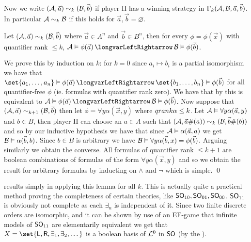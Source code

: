 \edefn

Now we write $({\cal A},\vec a)\sim_k({\cal B},\vec b)$ if player II has a winning strategy in $\Gamma_k({\cal A},{\cal B},\vec a,\vec b)$.
In particular ${\cal A}\sim_k{\cal B}$ if this holds for $\vec a,\vec b=\varnothing$.

\blemm

    Let $({\cal A},\vec a)\sim_k({\cal B},\vec b)$ where $\vec a\in A^n$ and $\vec b\in B^n$, then for every $\phi=\phi(\vec x)$ with quantifier rank $\leq k$,
    ${\cal A}\vDash\phi(\vec a)\iff{\cal B}\vDash\phi(\vec b)$.

\elemm

We prove this by induction on $k$: for $k=0$ since $a_i\mapsto b_i$ is a partial isomorphism we have that $\set{a_1,\dots,a_n}\vDash\phi(\vec a)\iff\set{b_1,\dots,b_n}\vDash\phi(\vec b)$ for all
quantifier-free $\phi$ (ie. formulas with quantifier rank zero).
We have that by  this is equivalent to ${\cal A}\vDash\phi(\vec a)\iff{\cal B}\vDash\phi(\vec b)$.
Now suppose that $({\cal A},\vec a)\sim_{k+1}({\cal B},\vec b)$ then let $\phi=\forall y\alpha(\vec x,y)$ where ${\sl qrank}\alpha\leq k$.
Let ${\cal A}\vDash\forall y\alpha(\vec a,y)$ and $b\in B$, then player II can choose an $a\in A$ such that $({\cal A},\vec a\#(a))\sim_k({\cal B},\vec b\#(b))$ and so by our inductive hypothesis we have
that since ${\cal A}\vDash\alpha(\vec a,a)$ we get ${\cal B}\vDash\alpha(\vec b,b)$.
Since $b\in B$ is arbitrary we have ${\cal B}\vDash\forall y\alpha(\vec b,x)=\phi(\vec b)$.
Arguing similarly we obtain the converse.
All formulas of quantifier rank $\leq k+1$ are boolean combinations of formulas of the form $\forall y\alpha(\vec x,y)$ and so we obtain the result for arbitrary formulas by inducting on $\land$ and $\neg$
which is simple.
\qed

 results simply in applying this lemma for all $k$.
This is actually quite a practical method proving the completeness of certain theories, like ${\sf SO}_{10},{\sf SO}_{01},{\sf SO}_{00}$.
${\sf SO}_{11}$ is obviously not complete as each $\exists_n$ is independent of it.
Since two finite discrete orders are isomorphic, and it can be shown by use of an EF-game that infinite models of ${\sf SO}_{11}$ are elementarily equivalent we get that
$X=\set{{\sf L},{\sf R},\exists_1,\exists_2,\dots}$ is a boolean basis of ${\cal L}^0$ in ${\sf SO}$ (by the ).

